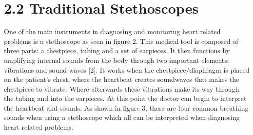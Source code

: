 \documentclass[twocolumn]{article}
\begin{document}
\section{2.2 Traditional Stethoscopes} 
One of the main instruments in diagnosing and monitoring heart related problems is a stethoscope as seen in figure 2. This medical tool is composed of three parts: a chestpiece, tubing and a set of earpieces. It then functions by amplifying internal sounds from the body through two important elements: vibrations and sound waves [2]. It works when the chestpiece/diaphragm is placed on the patient’s chest, where the heartbeat creates soundwaves that makes the chestpiece to vibrate. Where afterwards these vibrations make its way through the tubing and into the earpieces. At this point the doctor can begin to interpret the heartbeat and sounds. As shown in figure 3, there are four common breathing sounds when using a stethoscope which all can be interpreted when diagnosing heart related problems. 






\appendix
\end{document}
